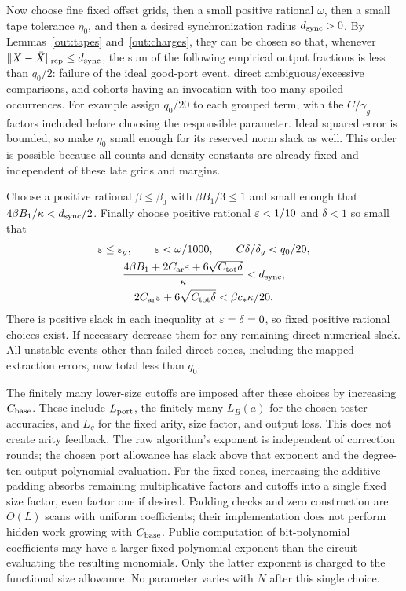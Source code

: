 Now choose fine fixed offset grids, then a small positive rational
$\omega$, then a small tape tolerance $\eta_0$, and then a desired
synchronization radius $d_{\rm sync}>0$. By
Lemmas~\ref{out:tapes} and~\ref{out:charges}, they can be chosen so that,
whenever $\lVert X-\bar X\rVert_{\rm rep}\leq d_{\rm sync}$, the sum of the
following empirical output fractions is less than $q_0/2$: failure of
the ideal good-port event, direct ambiguous/excessive comparisons,
and cohorts having an invocation with too many spoiled occurrences.
For example assign $q_0/20$ to each grouped term, with the
$C/\gamma_g$ factors included before choosing the responsible parameter.
Ideal squared error is bounded, so make $\eta_0$ small enough for its
reserved norm slack as well. This order is possible because all counts
and density constants are already fixed and independent of these late
grids and margins.

Choose a positive rational $\beta\leq\beta_0$ with
$\beta B_1/3\leq1$ and small enough that
$4\beta B_1/\kappa<d_{\rm sync}/2$. Finally choose positive rational
$\varepsilon<1/10$ and $\delta<1$ so small that
\begin{gather}
 \varepsilon\leq\varepsilon_g,\qquad\varepsilon<\omega/1000,
 \qquad C\delta/\delta_g<q_0/20,\label{out:epsilon-delta}\\
 \frac{4\beta B_1+2C_{\rm ar}\varepsilon
             +6\sqrt{C_{\rm tot}\delta}}{\kappa}<d_{\rm sync},
 \label{out:coarse-budget}\\
 2C_{\rm ar}\varepsilon+6\sqrt{C_{\rm tot}\delta}
                <\beta c_*\kappa/20.
 \label{out:fine-budget}
\end{gather}
There is positive slack in each inequality at $\varepsilon=\delta=0$, so
fixed positive rational choices exist. If necessary decrease them for
any remaining direct numerical slack. All unstable events other than
failed direct cones, including the mapped extraction errors, now total
less than $q_0$.

The finitely many lower-size cutoffs are imposed after these choices by
increasing $C_{\rm base}$. These include $L_{\rm port}$, the finitely
many $L_B(a)$ for the chosen tester accuracies, and $L_g$ for the fixed
arity, size factor, and output loss. This does not create arity feedback. The raw
algorithm's exponent is independent of correction rounds; the chosen
port allowance has slack above that exponent and the degree-ten output
polynomial evaluation. For the fixed cones, increasing the additive
padding absorbs remaining multiplicative factors and cutoffs into a
single fixed size factor, even factor one if desired. Padding checks
and zero construction are $O(L)$ scans with uniform coefficients; their
implementation does not perform hidden work growing with
$C_{\rm base}$. Public computation of bit-polynomial coefficients may
have a larger fixed polynomial exponent than the circuit evaluating
the resulting monomials. Only the latter exponent is charged to the
functional size allowance. No parameter varies with $N$ after this
single choice.

